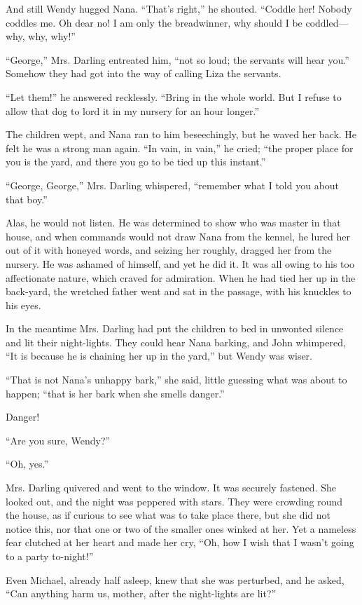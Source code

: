 And still Wendy hugged Nana.
``That's right,'' he shouted.
``Coddle her!
Nobody coddles me.
Oh dear no!
I am only the breadwinner, why should I be coddled—why, why, why!''

``George,'' Mrs. Darling entreated him, ``not so loud; the servants will hear
you.''
Somehow they had got into the way of calling Liza the servants.

``Let them!'' he answered recklessly.
``Bring in the whole world.
But I refuse to allow that dog to lord it in my nursery for an hour longer.''

The children wept, and Nana ran to him beseechingly, but he waved her back.
He felt he was a strong man again.
``In vain, in vain,'' he cried; ``the proper place for you is the yard, and
there you go to be tied up this instant.''

``George, George,'' Mrs. Darling whispered, ``remember what I told you about
that boy.''

Alas, he would not listen.
He was determined to show who was master in that house, and when commands would
not draw Nana from the kennel, he lured her out of it with honeyed words, and
seizing her roughly, dragged her from the nursery.
He was ashamed of himself, and yet he did it.
It was all owing to his too affectionate nature, which craved for admiration.
When he had tied her up in the back-yard, the wretched father went and sat in
the passage, with his knuckles to his eyes.

In the meantime Mrs. Darling had put the children to bed in unwonted silence and
lit their night-lights.
They could hear Nana barking, and John whimpered, ``It is because he is chaining
her up in the yard,'' but Wendy was wiser.

``That is not Nana's unhappy bark,'' she said, little guessing what was about to
happen; ``that is her bark when she smells danger.''

Danger!

``Are you sure, Wendy?''

``Oh, yes.''

Mrs. Darling quivered and went to the window.
It was securely fastened.
She looked out, and the night was peppered with stars.
They were crowding round the house, as if curious to see what was to take place
there, but she did not notice this, nor that one or two of the smaller ones
winked at her.
Yet a nameless fear clutched at her heart and made her cry, ``Oh, how I wish
that I wasn't going to a party to-night!''

Even Michael, already half asleep, knew that she was perturbed, and he asked,
``Can anything harm us, mother, after the night-lights are lit?''

